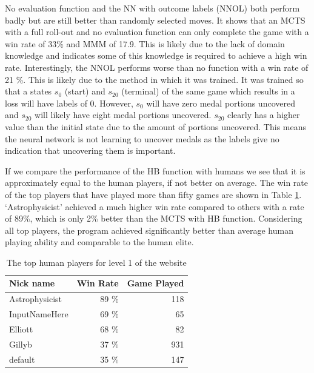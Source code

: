 \documentclass{bhamthesis}
\theoremstyle{definition}
\begin{document}
No evaluation function and the NN with outcome labels (NNOL) both perform badly but are still better than randomly selected moves. It shows that an MCTS with a full roll-out and no evaluation function can only complete the game with a win rate of 33\% and MMM of 17.9. This is likely due to the lack of domain knowledge and indicates some of this knowledge is required to achieve a high win rate. Interestingly, the NNOL performs worse than no function with a win rate of 21 \%. This is likely due to the method in which it was trained. It was trained so that a states $s_0$ (start) and $s_{20}$ (terminal) of the same game which results in a loss will have labels of 0. However, $s_0$ will have zero medal portions uncovered and $s_{20}$ will likely have eight medal portions uncovered. $s_{20}$ clearly has a higher value than the initial state due to the amount of portions uncovered. This means the neural network is not learning to uncover medals as the labels give no indication that uncovering them is important.

If we compare the performance of the HB function with humans we see that it is approximately equal to the human players, if not better on average. The win rate of the top players that have played more than fifty games are shown in Table \ref{t:humanWinRates}. `Astrophysicist' achieved a much higher win rate compared to others with a rate of 89\%, which is only 2\% better than the MCTS with HB function. Considering all top players, the program achieved significantly better than average human playing ability and comparable to the human elite.

\begin{table}[]
	\centering
	\caption{The top human players for level 1 of the website}
	\label{t:humanWinRates}
	\begin{tabular}{lrr}
		\hline
		Nick name      & Win Rate & Game Played \\ \hline
		Astrophysicist & 89 \%    & 118         \\
		InputNameHere  & 69 \%    & 65          \\
		Elliott        & 68 \%    & 82          \\
		Gillyb         & 37 \%    & 931         \\
		default        & 35 \%    & 147        
	\end{tabular}
\end{table}
\end{document}

